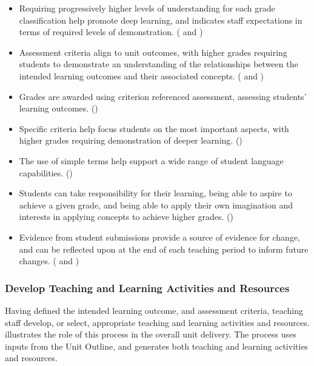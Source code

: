 \begin{itemize}[noitemsep,nolistsep]
	\item Requiring progressively higher levels of understanding for each grade classification help promote deep learning, and indicates staff expectations in terms of required levels of demonstration. ( and )
	\item Assessment criteria align to unit outcomes, with higher grades requiring students to demonstrate an understanding of the relationships between the intended learning outcomes and their associated concepts. ( and )
	\item Grades are awarded using criterion referenced assessment, assessing students' learning outcomes. ()
	\item Specific criteria help focus students on the most important aspects, with higher grades requiring demonstration of deeper learning. ()
	\item The use of simple terms help support a wide range of student language capabilities. ()
	\item Students can take responsibility for their learning, being able to aspire to achieve a given grade, and being able to apply their own imagination and interests in applying concepts to achieve higher grades. ()
	\item Evidence from student submissions provide a source of evidence for change, and can be reflected upon at the end of each teaching period to inform future changes. ( and )
\end{itemize}




\clearpage
\subsubsection{Develop Teaching and Learning Activities and Resources} %
\label{ssub:develop_teaching_and_learning_activities_and_resources}

Having defined the intended learning outcome, and assessment criteria, teaching staff develop, or select, appropriate teaching and learning activities and resources.  illustrates the role of this process in the overall unit delivery. The process uses inputs from the Unit Outline, and generates both teaching and learning activities and resources.


